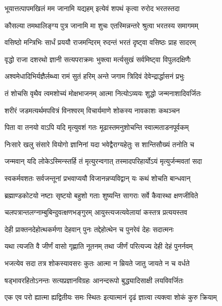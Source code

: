\twolineshloka
{भूयात्तत्पापमखिलं मम जानामि यद्यहम्}
{इत्येवं शपथं कृत्वा रुरोद भरतस्तदा} %

\twolineshloka
{कौसल्या तमथालिङ्ग्य पुत्र जानामि मा शुचः}
{एतस्मिन्नन्तरे श्रुत्वा भरतस्य समागमम्} %

\twolineshloka
{वसिष्ठो मन्त्रिभिः सार्धं प्रययौ राजमन्दिरम्}
{रुदन्तं भरतं दृष्ट्वा वसिष्ठः प्राह सादरम्} %

\twolineshloka
{वृद्धो राजा दशरथो ज्ञानी सत्यपराक्रमः}
{भुक्त्वा मर्त्यसुखं सर्वमिष्ट्वा विपुलदक्षिणैः} %

\twolineshloka
{अश्वमेधादिभिर्यज्ञैर्लब्ध्वा रामं सुतं हरिम्}
{अन्ते जगाम त्रिदिवं देवेन्द्रार्द्धासनं प्रभुः} %

\twolineshloka
{तं शोचसि वृथैव त्वमशोच्यं मोक्षभाजनम्}
{आत्मा नित्योऽव्ययः शुद्धो जन्मनाशादिवर्जितः} %

\twolineshloka
{शरीरं जडमत्यर्थमपवित्रं विनश्वरम्}
{विचार्यमाणे शोकस्य नावकाशः कथञ्चन} %

\twolineshloka
{पिता वा तनयो वाऽपि यदि मृत्युवशं गतः}
{मूढास्तमनुशोचन्ति स्वात्मताडनपूर्वकम्} %

\twolineshloka
{निःसारे खलु संसारे वियोगो ज्ञानिनां यदा}
{भवेद्वैराग्यहेतुः स शान्तिसौख्यं तनोति च} %

\twolineshloka
{जन्मवान् यदि लोकेऽस्मिन्स्तर्हि तं मृत्युरन्वगात्}
{तस्मादपरिहार्योऽयं मृत्युर्जन्मवतां सदा} %

\twolineshloka
{स्वकर्मवशतः सर्वजन्तूनां प्रभवाप्ययौ}
{विजानन्नप्यविद्वान् यः कथं शोचति बान्धवान्} %

\twolineshloka
{ब्रह्माण्डकोटयो नष्टाः सृष्टयो बहुशो गताः}
{शुष्यन्ति सागराः सर्वे कैवास्था क्षणजीविते} %

\twolineshloka
{चलपत्रान्तलग्नाम्बुबिन्दुवत्क्षणभङ्गुरम्}
{आयुस्त्यजत्यवेलायां कस्तत्र प्रत्ययस्तव} %

\twolineshloka
{देही प्राक्तनदेहोत्थकर्मणा देहवान् पुनः}
{तद्देहोत्थेन च पुनरेवं देहः सदात्मनः} %

\twolineshloka
{यथा त्यजति वै जीर्णं वासो गृह्णाति नूतनम्}
{तथा जीर्णं परित्यज्य देही देहं पुनर्नवम्} %

\twolineshloka
{भजत्येव सदा तत्र शोकस्यावसरः कुतः}
{आत्मा न म्रियते जातु जायते न च वर्धते} %

\twolineshloka
{षड्भावरहितोऽनन्तः सत्यप्रज्ञानविग्रहः}
{आनन्दरूपो बुद्ध्यादिसाक्षी लयविवर्जितः} %

\twolineshloka
{एक एव परो ह्यात्मा ह्यद्वितीयः समः स्थितः}
{इत्यात्मानं दृढं ज्ञात्वा त्यक्त्वा शोकं कुरु क्रियाम्} %

